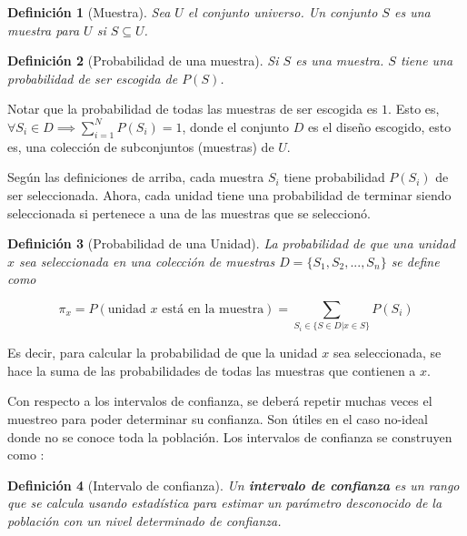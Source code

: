\documentclass[conference]{IEEEtran}
\newtheorem{definition}{Definición}
\begin{document}
\bigbreak

\begin{definition}[Muestra]
    Sea $U$ el conjunto universo. Un conjunto $S$ es una muestra para $U$ si $S \subseteq U$.
\end{definition}

\bigbreak

\begin{definition}[Probabilidad de una muestra]
    Si $S$ es una muestra. $S$ tiene una probabilidad de ser escogida de $P(S)$.
\end{definition}

\bigbreak

Notar que la probabilidad de todas las muestras de ser escogida es $1$. Esto es, $\forall S_i \in D \implies \sum \limits_{i=1}^{N} P(S_i) = 1$, donde el conjunto $D$ es el diseño escogido, esto es, una colección de subconjuntos (muestras) de $U$.

\bigbreak

Según las definiciones de arriba, cada muestra $S_i$ tiene probabilidad $P(S_i)$ de ser seleccionada. Ahora, cada unidad tiene una probabilidad de terminar siendo seleccionada si pertenece a una de las muestras que se seleccionó.

\begin{definition}[Probabilidad de una Unidad]
    La probabilidad de que una unidad $x$ sea seleccionada en una colección de muestras $D = \{ S_1, S_2, ..., S_n \}$ se define como
    
    $$
    \pi_x = P(\text{unidad $x$ está en la muestra}) = \sum \limits_{S_i \in \{ S \in D | x \in S \}} P(S_i)
    $$
\end{definition}

\bigbreak

Es decir, para calcular la probabilidad de que la unidad $x$ sea seleccionada, se hace la suma de las probabilidades de todas las muestras que contienen a $x$.

\bigbreak

Con respecto a los intervalos de confianza, se deberá repetir muchas veces el muestreo para poder determinar su confianza. Son útiles en el caso no-ideal donde no se conoce toda la población. Los intervalos de confianza se construyen como \cite{the-pennsylvania-state-university-no-date}:

\begin{definition}[Intervalo de confianza]
    Un \textbf{intervalo de confianza} es un rango que se calcula usando estadística para estimar un parámetro desconocido de la población con un nivel determinado de confianza.
\end{definition}
\end{document}
